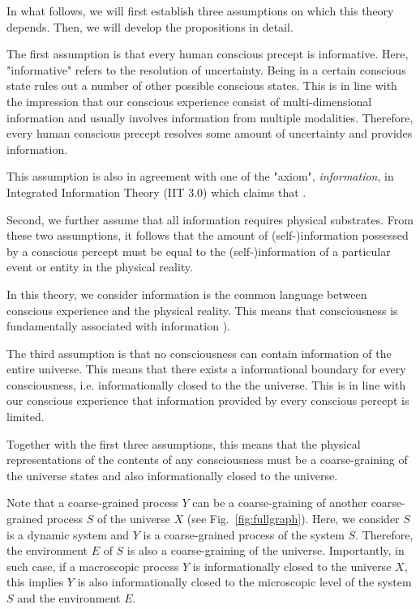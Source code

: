 \documentclass[utf8]{article}
\begin{document}
        In what follows, we will first establish three assumptions on which this theory depends. Then, we will develop the propositions in detail. 
        
        The first assumption is that every human conscious precept is informative. Here, "informative" refers to the resolution of uncertainty. Being in a certain conscious state rules out a number of other possible conscious states. This is in line with the impression that our conscious experience consist of multi-dimensional information and usually involves information from multiple modalities. Therefore, every human conscious precept resolves some amount of uncertainty and provides information.  
        
        This assumption is also in agreement with one of the "axiom", \textit{information}, in Integrated Information Theory (IIT 3.0) which claims that  \citep[p.2]{oizumi2014phenomenology}.
        
        Second, we further assume that all information requires physical substrates. 
        From these two assumptions, it follows that the amount of (self-)information possessed by a conscious percept must be equal to the (self-)information of a particular event or entity in the physical reality. 
        
        In this theory, we consider information is the common language between conscious experience and the physical reality. This means that consciousness is fundamentally associated with information \citep{chalmers1996conscious, tononi2004information, gamez2011information, Gamez2016}).
        
        The third assumption is that no consciousness can contain information of the entire universe. This means that there exists a informational boundary for every consciousness, i.e. informationally closed to the the universe. This is in line with our conscious experience that information provided by every conscious percept is limited.
    
        Together with the first three assumptions, this means that the physical representations of the contents of any consciousness must be a coarse-graining of the universe states and also informationally closed to the universe.
        
        Note that a coarse-grained process $Y$ can be a coarse-graining of another coarse-grained process $S$ of the universe $X$ (see Fig.~\ref{fig:fullgraph}). Here, we consider $S$ is a dynamic system and $Y$ is a coarse-grained process of the system $S$. Therefore, the environment $E$ of $S$ is also a coarse-graining of the universe. Importantly, in such case, if a macroscopic process $Y$ is informationally closed to the universe $X$, this implies $Y$ is also informationally closed to the microscopic level of the system $S$ and the environment $E$. 
    
\end{document}
